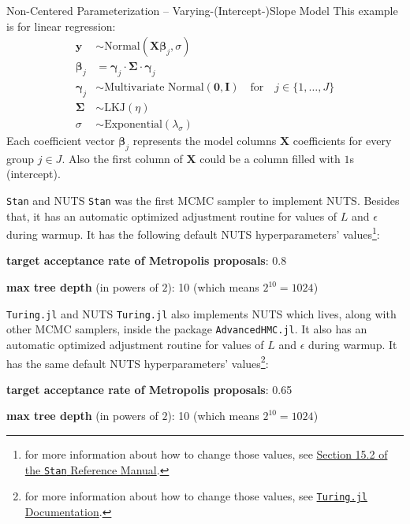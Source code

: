 \begin{frame}{Non-Centered Parameterization -- Varying-(Intercept-)Slope Model}
	This example is for linear regression:
	$$
		\begin{aligned}
			\mathbf{y}            & \sim \text{Normal}(\mathbf{X} \boldsymbol{\beta}_{j}, \sigma)                 \\
			\boldsymbol{\beta}_j  & = \boldsymbol{\gamma}_j \cdot \boldsymbol{\Sigma} \cdot \boldsymbol{\gamma}_j \\
			\boldsymbol{\gamma}_j & \sim \text{Multivariate Normal}(\mathbf{0}, \mathbf{I})
			\quad \text{for}\quad j \in \{ 1, \dots, J \}                                                         \\
			\boldsymbol{\Sigma}   & \sim \text{LKJ}(\eta)                                                         \\
			\sigma                & \sim \text{Exponential}(\lambda_\sigma)
		\end{aligned}
	$$
	Each coefficient vector $\boldsymbol{\beta}_j$ represents the
	model columns $\mathbf{X}$ coefficients for every group $j \in J$.
	Also the first column of $\mathbf{X}$ could be a column filled with $1$s
	(intercept).
\end{frame}

\begin{frame}{\texttt{Stan} and NUTS}
	\texttt{Stan} was the first MCMC sampler to implement NUTS.
	Besides that, it has an automatic optimized adjustment routine for values of $L$ and $\epsilon$ during warmup.
	It has the following default NUTS hyperparameters' values\footnote{
		for more information about how to change those values, see \href{
			https://mc-stan.org/docs/reference-manual/hmc-algorithm-parameters.html}{
			Section 15.2 of the \texttt{Stan} Reference Manual}.}:
	\begin{vfilleditems}
		\item \textbf{target acceptance rate of Metropolis proposals}: 0.8
		\item \textbf{max tree depth} (in powers of $2$): 10 (which means $2^{10} = 1024$)
	\end{vfilleditems}
\end{frame}

\begin{frame}{\texttt{Turing.jl} and NUTS}
	\texttt{Turing.jl} also implements NUTS which lives, along with other MCMC samplers, inside the package \texttt{AdvancedHMC.jl}.
	It also has an automatic optimized adjustment routine for values of $L$ and $\epsilon$ during warmup.
	It has the same default NUTS hyperparameters' values\footnote{
		for more information about how to change those values, see \href{
			https://turing.ml/dev/docs/library}{
			\texttt{Turing.jl} Documentation}.}:
	\begin{vfilleditems}
		\item \textbf{target acceptance rate of Metropolis proposals}: 0.65
		\item \textbf{max tree depth} (in powers of $2$): 10 (which means $2^{10} = 1024$)
	\end{vfilleditems}
\end{frame}

